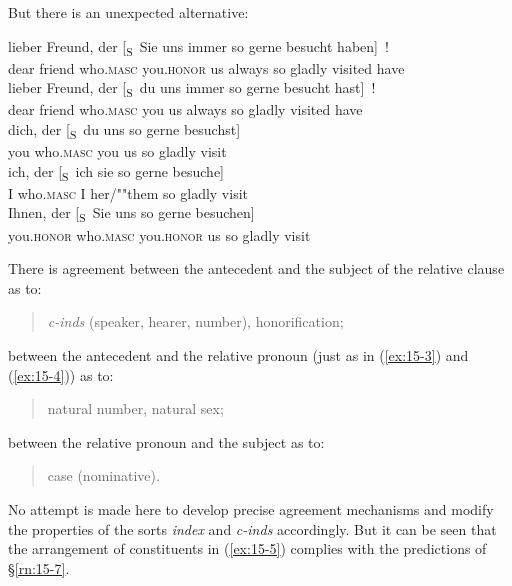 \documentclass[output=paper]{LSP/langsci}
\begin{document}
%
\randnum\label{rn:15-9}But there is an unexpected alternative:
\begin{exe}
\ex%
\label{ex:15-5}
\begin{xlist}
\ex%
\label{ex:15-5a1}
\gll
lieber Freund, der [\textsubscript{S}~Sie uns immer so gerne besucht haben]~! \\
dear friend who.\textsc{masc} \hphantom{[\textsubscript{S}~}you.\textsc{honor} us always so gladly visited have \\
\gll
lieber Freund, der [\textsubscript{S}~du uns immer so gerne besucht hast]~! \\
dear friend who.\textsc{masc} \hphantom{[\textsubscript{S}~}you us always so gladly visited have \\
\ex%
\label{ex:15-5b}
\gll
dich, der [\textsubscript{S}~du uns so gerne besuchst] \\
you who.\textsc{masc} \hphantom{[\textsubscript{S}~}you us so gladly visit \\
\ex%
\label{ex:15-5c}
\gll
ich, der [\textsubscript{S}~ich sie so gerne besuche] \\
I who.\textsc{masc} \hphantom{[\textsubscript{S}~}I her/""them so gladly visit \\
\ex%
\label{ex:15-5d}
\gll
Ihnen, der [\textsubscript{S}~Sie uns so gerne besuchen] \\
you.\textsc{honor} who.\textsc{masc} \hphantom{[\textsubscript{S}~}you.\textsc{honor} us so gladly visit \\
\end{xlist}
\end{exe}
%
\randnum\label{rn:15-10}There is agreement between the antecedent and the subject of the relative clause as to: 
\begin{quotation}
\textit{c-inds} (speaker, hearer, number), honorification;
\end{quotation}
between the antecedent and the relative pronoun (just as in (\ref{ex:15-3}) and (\ref{ex:15-4})) as to: 
\begin{quotation}
natural number, natural sex;
\end{quotation}
between the relative pronoun and the subject as to: 
\begin{quotation}
case (nominative).
\end{quotation}
\randnum\label{rn:15-11}No attempt is made here to develop precise agreement mechanisms and
modify the properties of the sorts \textit{index} and \textit{c-inds} accordingly. But it can be seen that the arrangement of constituents in (\ref{ex:15-5}) complies with the predictions of §\ref{rn:15-7}.
\end{document}
